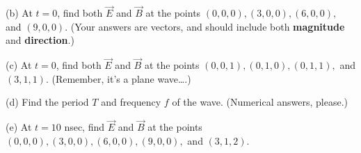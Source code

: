(b) At $t=0$, find both $\vec E$ and $\vec B$ at the points $(0,0,0), (3,0,0), (6,0,0),$ and $(9,0,0)$.  (Your answers are vectors, and should include both \textbf{magnitude} and \textbf{direction}.) 
\vspace{1.0in}

(c) At $t=0$, find both $\vec E$ and $\vec B$ at the points $(0,0,1), (0,1,0), (0,1,1),$ and $(3,1,1)$.  (Remember, it's a plane wave….)
\vspace{1.0in}

(d)  Find the period $T$ and frequency $f$ of the wave.  (Numerical answers, please.)
\vspace{1.0in}

(e)  At $t=10$ nsec, find $\vec E$ and $\vec B$ at the points $(0,0,0), (3,0,0), (6,0,0), (9,0,0),$ and $(3,1,2)$.  
\vspace{1.0in}



